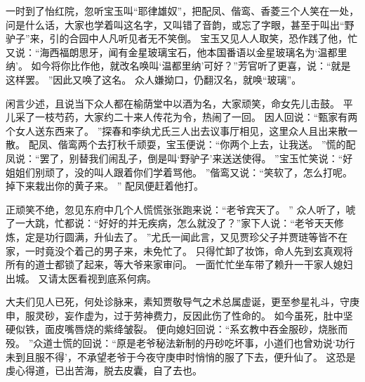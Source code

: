 一时到了怡红院，忽听宝玉叫“耶律雄奴”，把配凤、偕鸾、香菱三个人笑在一处，问是什么话，大家也学着叫这名字，又叫错了音韵，或忘了字眼，甚至于叫出“野驴子”来，引的合园中人凡听见者无不笑倒。
宝玉又见人人取笑，恐作践了他，忙又说：“海西福朗思牙，闻有金星玻璃宝石，他本国番语以金星玻璃名为‘温都里纳’。
如今将你比作他，就改名唤叫‘温都里纳’可好？”芳官听了更喜，说：“就是这样罢。
”因此又唤了这名。
众人嫌拗口，仍翻汉名，就唤“玻璃”。
\par
闲言少述，且说当下众人都在榆荫堂中以酒为名，大家顽笑，命女先儿击鼓。
平儿采了一枝芍药，大家约二十来人传花为令，热闹了一回。
因人回说：“甄家有两个女人送东西来了。
”探春和李纨尤氏三人出去议事厅相见，这里众人且出来散一散。
配凤、偕鸾两个去打秋千顽耍，宝玉便说：“你两个上去，让我送。
”慌的配凤说：“罢了，别替我们闹乱子，倒是叫‘野驴子’来送送使得。
”宝玉忙笑说：“好姐姐们别顽了，没的叫人跟着你们学着骂他。
”偕鸾又说：“笑软了，怎么打呢。
掉下来栽出你的黄子来。
”
配凤便赶着他打。
\par
正顽笑不绝，忽见东府中几个人慌慌张张跑来说：“老爷宾天了。
”
众人听了，唬了一大跳，忙都说：“好好的并无疾病，怎么就没了？”家下人说：“老爷天天修炼，定是功行圆满，升仙去了。
”尤氏一闻此言，又见贾珍父子并贾琏等皆不在家，一时竟没个着己的男子来，未免忙了。
只得忙卸了妆饰，命人先到玄真观将所有的道士都锁了起来，等大爷来家审问。
一面忙忙坐车带了赖升一干家人媳妇出城。
又请太医看视到底系何病。
\par
大夫们见人已死，何处诊脉来，素知贾敬导气之术总属虚诞，更至参星礼斗，守庚申，服灵砂，妄作虚为，过于劳神费力，反因此伤了性命的。
如今虽死，肚中坚硬似铁，面皮嘴唇烧的紫绛皱裂。
便向媳妇回说：“系玄教中吞金服砂，烧胀而殁。
”众道士慌的回说：“原是老爷秘法新制的丹砂吃坏事，小道们也曾劝说‘功行未到且服不得’，不承望老爷于今夜守庚申时悄悄的服了下去，便升仙了。
这恐是虔心得道，已出苦海，脱去皮囊，自了去也。
